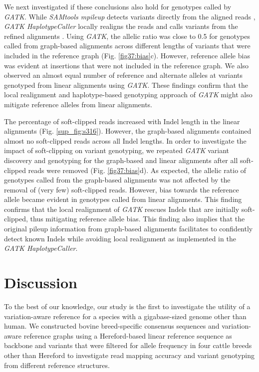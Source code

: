 \documentclass[../main.tex]{subfiles}
\begin{document}
We next investigated if these conclusions also hold for genotypes called by \emph{GATK}. While \emph{SAMtools mpileup} detects variants directly from the aligned reads \citep{li2009sequence}, \emph{GATK HaplotypeCaller} locally realigns the reads and calls variants from the refined alignments \citep{poplin2017scaling}. Using \emph{GATK}, the allelic ratio was close to 0.5 for genotypes called from graph-based alignments across different lengths of variants that were included in the reference graph (Fig. \ref{fig37:bias}c). However, reference allele bias was evident at insertions that were not included in the reference graph. We also observed an almost equal number of reference and alternate alleles at variants genotyped from linear alignments using \emph{GATK}. These findings confirm that the local realignment and haplotype-based genotyping approach of \emph{GATK} might also mitigate reference alleles from linear alignments.

The percentage of soft-clipped reads increased with Indel length in the linear alignments (Fig. \ref{sup_fig:s316}). However, the graph-based alignments contained almost no soft-clipped reads across all Indel lengths. In order to investigate the impact of soft-clipping on variant genotyping, we repeated \emph{GATK} variant discovery and genotyping for the graph-based and linear alignments after all soft-clipped reads were removed (Fig. \ref{fig37:bias}d). As expected, the allelic ratio of genotypes called from the graph-based alignments was not affected by the removal of (very few) soft-clipped reads. However, bias towards the reference allele became evident in genotypes called from linear alignments. This finding confirms that the local realignment of \emph{GATK} rescues Indels that are initially soft-clipped, thus mitigating reference allele bias. This finding also implies that the original pileup information from graph-based alignments facilitates to confidently detect known Indels while avoiding local realignment as implemented in the \emph{GATK HaplotypeCaller}.

\section{Discussion}

To the best of our knowledge, our study is the first to investigate the utility of a variation-aware reference for a species with a gigabase-sized genome other than human. We constructed bovine breed-specific consensus sequences and variation-aware reference graphs using a Hereford-based linear reference sequence as backbone and variants that were filtered for allele frequency in four cattle breeds other than Hereford to investigate read mapping accuracy and variant genotyping from different reference structures.
\end{document}

